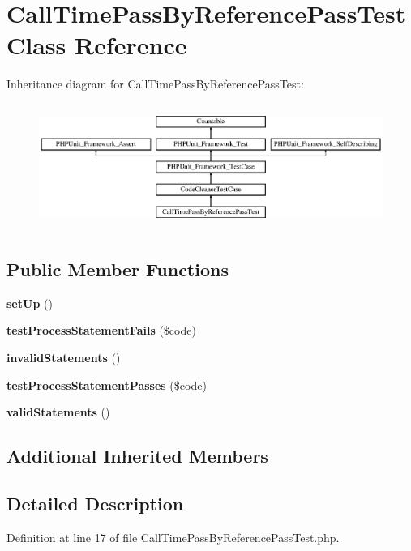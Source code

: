 \section{Call\+Time\+Pass\+By\+Reference\+Pass\+Test Class Reference}
\label{class_psy_1_1_test_1_1_code_cleaner_1_1_call_time_pass_by_reference_pass_test}
Inheritance diagram for Call\+Time\+Pass\+By\+Reference\+Pass\+Test\+:\begin{figure}[H]
\begin{center}
\leavevmode
\includegraphics[height=4.129793cm]{class_psy_1_1_test_1_1_code_cleaner_1_1_call_time_pass_by_reference_pass_test}
\end{center}
\end{figure}
\subsection*{Public Member Functions}
\begin{DoxyCompactItemize}
\item 
{\bf set\+Up} ()
\item 
{\bf test\+Process\+Statement\+Fails} (\$code)
\item 
{\bf invalid\+Statements} ()
\item 
{\bf test\+Process\+Statement\+Passes} (\$code)
\item 
{\bf valid\+Statements} ()
\end{DoxyCompactItemize}
\subsection*{Additional Inherited Members}


\subsection{Detailed Description}


Definition at line 17 of file Call\+Time\+Pass\+By\+Reference\+Pass\+Test.\+php.



